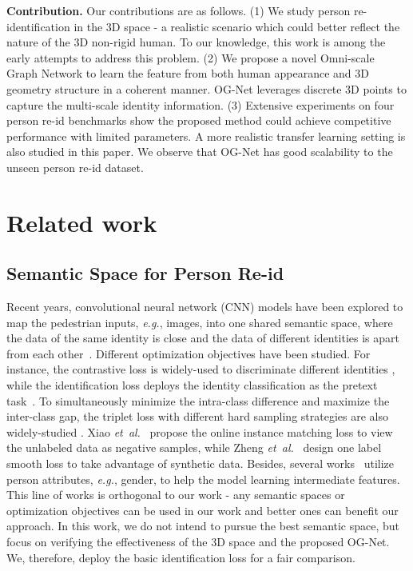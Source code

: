 \documentclass[journal]{IEEEtran}
\def\eg{\emph{e.g.}}
\def\etal{\emph{et~al.}}
\begin{document}
\textbf{Contribution.} Our contributions are as follows. 
(1) We study person re-identification in the 3D space - a realistic scenario which could better reflect the nature of the 3D non-rigid human. To our knowledge, this work is among the early attempts to address this problem. (2) We propose a novel Omni-scale Graph Network to learn the feature from both human appearance and 3D geometry structure in a coherent manner. OG-Net leverages discrete 3D points to capture the multi-scale identity information. (3) Extensive experiments on four person re-id benchmarks show the proposed method could achieve competitive performance with limited parameters. A more realistic transfer learning setting is also studied in this paper. We observe that OG-Net has good scalability to the unseen person re-id dataset. 

\section{Related work}
\subsection{Semantic Space for Person Re-id} 
Recent years, convolutional neural network (CNN) models have been explored to map the pedestrian inputs, \eg, images, into one shared semantic space, where the data of the same identity is close and the data of different identities is apart from each other~\cite{yang2017enhancing,zhang2016learning}. Different optimization objectives have been studied. For instance, the contrastive loss is widely-used to discriminate different identities \cite{yi2014deep,zheng2018discriminatively,lin2018unsupervised}, while the identification loss deploys the identity classification as the pretext task~\cite{zheng2016survey,zhong2018camera,yu2017devil}. To simultaneously minimize the intra-class difference and maximize the inter-class gap, the triplet loss with different hard sampling strategies are also widely-studied \cite{hermans2017defense,ristani2018features,yang2018person}. Xiao \etal~\cite{xiao2017joint} propose the online instance matching loss to view the unlabeled data as negative samples, while Zheng \etal~\cite{zheng2017unlabeled} design one label smooth loss to take advantage of synthetic data. Besides, several works~\cite{lin2019improving,wang2018transferable,wang2017attribute} utilize person attributes, \eg, gender, to help the model learning intermediate features. This line of works is orthogonal to our work - any semantic spaces or optimization objectives can be used in our work and better ones can benefit our approach. In this work, we do not intend to pursue the best semantic space, but focus on verifying the effectiveness of the 3D space and the proposed OG-Net. We, therefore, deploy the basic identification loss for a fair comparison.
\end{document}
